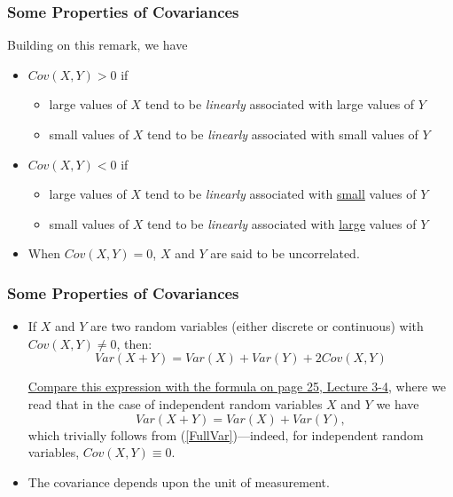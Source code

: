 \documentclass[notes=show,handout]{beamer}
\newenvironment{stepitemize}{\begin{itemize}[<+->]}{\end{itemize} }
\begin{document}
\begin{frame}%

\frametitle{Some Properties of Covariances}

Building on this remark, we have

\begin{stepitemize}

\item 
\color{black}%
$Cov(X,Y)>0$ if
\begin{stepitemize}
\item large values of $X$ tend to be \emph{linearly }associated with large
values of $Y$
\item small values of $X$ tend to be \emph{linearly }associated with small
values of $Y$\bigskip
\end{stepitemize}
\item $Cov(X,Y)<0$ if
\begin{stepitemize}
\item large values of $X$ tend to be \emph{linearly }associated with
\underline{small} values of $Y$
\item small values of $X$ tend to be \emph{linearly }associated with
\underline{large} values of $Y$\bigskip
\end{stepitemize}
\item When $Cov(X,Y)=0$, $X$ and $Y$ are said to be uncorrelated.
\end{stepitemize}
%
\end{frame}
%
\begin{frame}%
%
\frametitle{Some Properties of Covariances}
%
\begin{stepitemize}
\item  If $X$ and $Y$ are two random variables (either discrete or continuous) with $Cov(X,Y) \neq 0$, then:
\begin{equation}
Var(X + Y) =  Var(X) + Var(Y) + 2 Cov(X,Y) \label{FullVar}
\end{equation}

\underline{Compare this expression with the formula on page 25, Lecture 3-4}, where we read that in the case of independent random variables $X$ and $Y$
we have
$$
Var(X + Y) =  Var(X) + Var(Y),
$$
which trivially follows from (\ref{FullVar})---indeed, for independent random variables, $Cov(X,Y)\equiv 0$.

\item The covariance depends upon the unit of measurement.


\end{stepitemize}
%
\end{frame}
\end{document}
